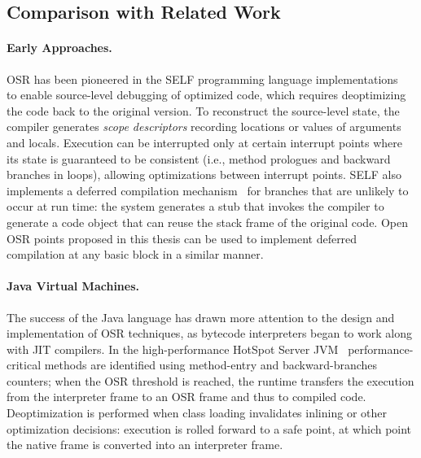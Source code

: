 

\subsection{Comparison with Related Work}
\label{ss:osr-llvm-related}

\paragraph*{Early Approaches.} OSR has been pioneered in the SELF programming language implementations~\cite{Holzle92} to enable source-level debugging of optimized code, which requires deoptimizing the code back to the original version. To reconstruct the source-level state, the compiler generates {\em scope descriptors} recording locations or values of arguments and locals. Execution can be interrupted only at certain interrupt points where its state is guaranteed to be consistent (i.e., method prologues and backward branches in loops), allowing optimizations between interrupt points. SELF also implements a deferred compilation mechanism~\cite{Chambers91} for branches that are unlikely to occur at run time: the system generates a stub that invokes the compiler to generate a code object that can reuse the stack frame of the original code. Open OSR points proposed in this thesis can be used to implement deferred compilation at any basic block in a similar manner.

\paragraph*{Java Virtual Machines.} The success of the Java language has drawn more attention to the design and implementation of OSR techniques, as bytecode interpreters began to work along with JIT compilers. In the high-performance HotSpot Server JVM~\cite{Paleczny01} performance-critical methods are identified using method-entry and backward-branches counters; when the OSR threshold is reached, the runtime transfers the execution from the interpreter frame to an OSR frame and thus to compiled code. Deoptimization is performed when class loading invalidates inlining or other optimization decisions: execution is rolled forward to a safe point, at which point the native frame is converted into an interpreter frame.

